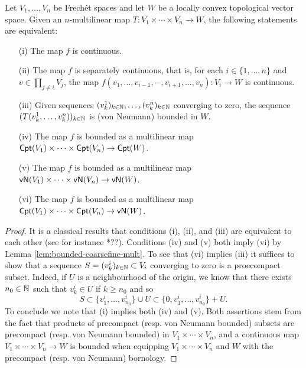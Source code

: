 \begin{proposition}\label{prop:mult-frechet} Let $V_1, \ldots, V_n$ be Frechét spaces and let $W$ be 
a locally convex topological vector space.  Given an $n$-multilinear
map $T \colon V_1 \times \cdots \times V_n \to W$, 
the following statements are equivalent:
\begin{itemize}
    \item[(i)] The map $f$ is continuous.
    \item[(ii)] The map $f$ is separately continuous, that is, for each $i \in \{1, \ldots, n\}$
    and $v \in \prod_{j \neq i} V_j$, the map $f(v_1, \ldots, v_{i-1}, -, v_{i+1}, \ldots, v_n) \colon V_i \to W$ 
    is continuous. 
    \item[(iii)] Given sequences $(v^1_k)_{k \in \mathbb N}, \ldots, (v^n_k)_{k \in \mathbb N}$ converging to zero, 
    the sequence $(T(v^1_k, \ldots, v^n_k))_{k \in \mathbb N}$ is (von Neumann) bounded in $W$. 
    \item[(iv)] The map $f$ is bounded as a multilinear map $\mathsf{Cpt}(V_1) \times \cdots \times \mathsf{Cpt}(V_n) \to \mathsf{Cpt}(W)$.
    \item[(v)] The map $f$ is bounded as a multilinear map $\mathsf{vN}(V_1) \times \cdots \times \mathsf{vN}(V_n) \to \mathsf{vN}(W)$.
    \item[(vi)] The map $f$ is bounded as a multilinear map $\mathsf{Cpt}(V_1) \times \cdots \times \mathsf{Cpt}(V_n) \to \mathsf{vN}(W)$.
\end{itemize}
\end{proposition}
\begin{proof} It is a classical results that
conditions (i), (ii), and (iii) are equivalent to each other (see 
for instance \cite{??}*{??}). 
Conditions (iv) and (v) both imply (vi) by Lemma \ref{lem:bounded-coarsefine-mult}. 
To see that (vi) implies (iii) it suffices to show that a sequence $S = (v^i_k)_{k\in\mathbb N} 
\subset V_i$ converging to zero is a proecompact subset. Indeed, if 
$U$ is a neighbourhood of the origin, we know that there exists $n_0 \in \mathbb N$
such that $v^i_k \in U$ if $k \ge n_0$ and so 
\[
S \subset \{v^i_1, \ldots, v^i_{n_0}\} \cup U \subset \{0,v^i_1, \ldots, v^i_{n_0}\} + U.
\]
To conclude we note that (i) implies both (iv) and (v). Both assertions 
stem from the fact that products of precompact (resp. von Neumann bounded) subsets
are precompact (resp. von Neumann bounded) in $V_1 \times \cdots \times V_n$, and 
a continuous map $V_1 \times \cdots \times V_n \to W$ is bounded 
when equipping $V_1 \times \cdots \times V_n$ and $W$ with the precompact (resp. von Neumann)
bornology. 
\end{proof}



